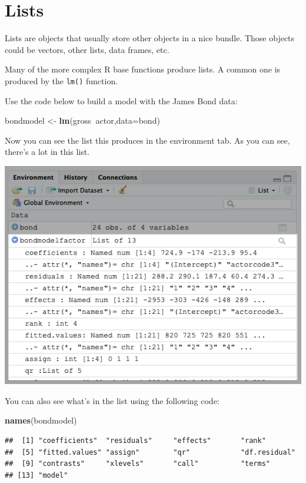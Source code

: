 \documentclass[
]{book}
\newenvironment{Shaded}{\begin{snugshade}}{\end{snugshade}}
\newcommand{\DataTypeTok}[1]{\textcolor[rgb]{0.13,0.29,0.53}{#1}}
\newcommand{\KeywordTok}[1]{\textcolor[rgb]{0.13,0.29,0.53}{\textbf{#1}}}
\newcommand{\NormalTok}[1]{#1}
\newcommand{\OperatorTok}[1]{\textcolor[rgb]{0.81,0.36,0.00}{\textbf{#1}}}
\newcommand{\StringTok}[1]{\textcolor[rgb]{0.31,0.60,0.02}{#1}}
\begin{document}
\hypertarget{lists}{%
\section{Lists}\label{lists}}

Lists are objects that usually store other objects in a nice bundle. Those objects could be vectors, other lists, data frames, etc.

Many of the more complex R base functions produce lists. A common one is produced by the \texttt{lm()} function.

Use the code below to build a model with the James Bond data:

\begin{Shaded}
\begin{Highlighting}[]
\NormalTok{bondmodel <-}\StringTok{ }\KeywordTok{lm}\NormalTok{(gross}\OperatorTok{~}\NormalTok{actor,}\DataTypeTok{data=}\NormalTok{bond)}
\end{Highlighting}
\end{Shaded}

Now you can see the list this produces in the environment tab. As you can see, there's a lot in this list.

\begin{center}\includegraphics[width=0.5\linewidth]{1.34_List} \end{center}

You can also see what's in the list using the following code:

\begin{Shaded}
\begin{Highlighting}[]
\KeywordTok{names}\NormalTok{(bondmodel)}
\end{Highlighting}
\end{Shaded}

\begin{verbatim}
##  [1] "coefficients"  "residuals"     "effects"       "rank"         
##  [5] "fitted.values" "assign"        "qr"            "df.residual"  
##  [9] "contrasts"     "xlevels"       "call"          "terms"        
## [13] "model"
\end{verbatim}
\end{document}

